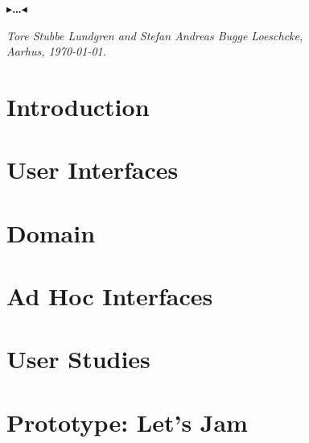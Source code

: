 \documentclass[oneside,11pt,openright]{report}
\newcommand{\todo}[1]{{\color[rgb]{.5,0,0}\textbf{$\blacktriangleright$#1$\blacktriangleleft$}}}
\begin{document}
{\todo{\dots}

\vspace{2ex}
\begin{flushright}
  \emph{Tore Stubbe Lundgren and Stefan Andreas Bugge Loeschcke,}\\
  \emph{Aarhus, \today.}
\end{flushright}

\tableofcontents
{}
\setcounter{secnumdepth}{2}




\listoffigures

\chapter{Introduction}
\label{ch:intro}


\chapter{User Interfaces}
\label{ch:ui}


\chapter{Domain}
\label{ch:domain}


\chapter{Ad Hoc Interfaces}
\label{ch:adhoc}


\chapter{User Studies}
\label{ch:workshops}


\chapter{Prototype: Let's Jam}
\label{ch:jamming}


}
\end{document}
